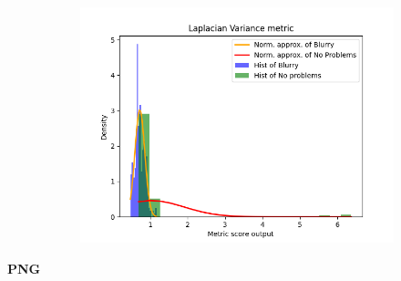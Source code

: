 \begin{figure}[H]
    \begin{subfigure}[t]{0.48\textwidth}
        \includegraphics[width=\textwidth]{Figures/BlurredImages/results_on_thresholds/output_dens_lv.png}
        \caption{}
        \label{fig:LV_dens}
    \end{subfigure}\hspace{1em}
    \caption{}
    \label{fig:LV_final}
\end{figure}

\textbf{PNG}

